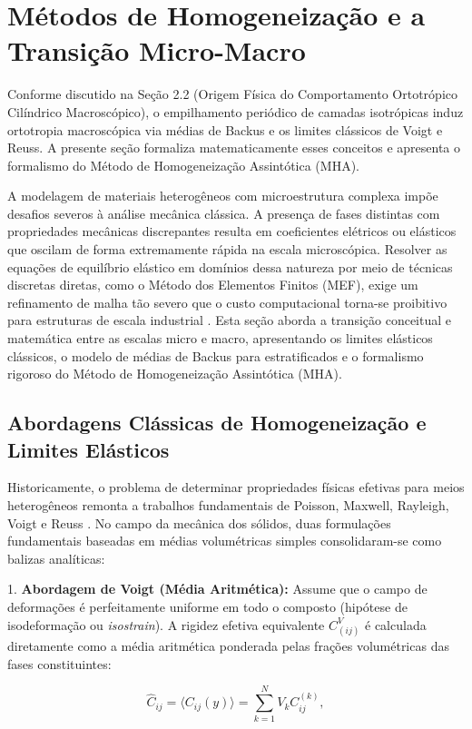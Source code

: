 \section{Métodos de Homogeneização e a Transição Micro-Macro}

Conforme discutido na Seção 2.2 (Origem Física do Comportamento Ortotrópico Cilíndrico Macroscópico), o empilhamento periódico de camadas isotrópicas induz ortotropia macroscópica via médias de Backus e os limites clássicos de Voigt e Reuss. A presente seção formaliza matematicamente esses conceitos e apresenta o formalismo do Método de Homogeneização Assintótica (MHA).

A modelagem de materiais heterogêneos com microestrutura complexa impõe desafios severos à análise mecânica clássica. A presença de fases distintas com propriedades mecânicas discrepantes resulta em coeficientes elétricos ou elásticos que oscilam de forma extremamente rápida na escala microscópica. Resolver as equações de equilíbrio elástico em domínios dessa natureza por meio de técnicas discretas diretas, como o Método dos Elementos Finitos (MEF), exige um refinamento de malha tão severo que o custo computacional torna-se proibitivo para estruturas de escala industrial \cite{bakhvalov1989}. Esta seção aborda a transição conceitual e matemática entre as escalas micro e macro, apresentando os limites elásticos clássicos, o modelo de médias de Backus para estratificados e o formalismo rigoroso do Método de Homogeneização Assintótica (MHA).

\subsection{Abordagens Clássicas de Homogeneização e Limites Elásticos}

Historicamente, o problema de determinar propriedades físicas efetivas para meios heterogêneos remonta a trabalhos fundamentais de Poisson, Maxwell, Rayleigh, Voigt e Reuss \cite{PartonReport}. No campo da mecânica dos sólidos, duas formulações fundamentais baseadas em médias volumétricas simples consolidaram-se como balizas analíticas:

1. \textbf{Abordagem de Voigt (Média Aritmética):} Assume que o campo de deformações é perfeitamente uniforme em todo o composto (hipótese de isodeformação ou \textit{isostrain}). A rigidez efetiva equivalente $C_(i j)^V$ é calculada diretamente como a média aritmética ponderada pelas frações volumétricas das fases constituintes:
  
\begin{equation}
    \hat{C}_{ij} = \langle C_{ij}(y) \rangle = \sum_{k=1}^{N} V_k C_{ij}^{(k)} ,
\end{equation} \label{eq:voigt_mean}

